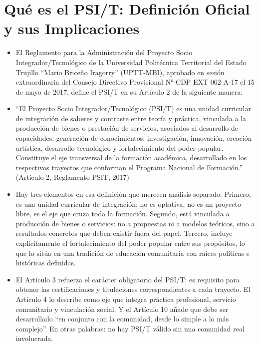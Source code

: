 \documentclass[14pt,a4paper,oneside]{extbook}
\begin{document}
\section{Qué es el PSI/T: Definición Oficial y sus Implicaciones}
\begin{itemize}
\item El Reglamento para la Administración del Proyecto Socio Integrador/Tecnológico de la Universidad Politécnica Territorial del Estado Trujillo \enquote{Mario Briceño Iragorry} (UPTT-MBI), aprobado en sesión extraordinaria del Consejo Directivo Provisional N° CDP EXT 062-A-17 el 15 de mayo de 2017, define el PSI/T en su Artículo 2 de la siguiente manera:
\item \enquote{El Proyecto Socio Integrador/Tecnológico (PSI/T) es una unidad curricular de integración de saberes y contraste entre teoría y práctica, vinculada a la producción de bienes o prestación de servicios, asociados al desarrollo de capacidades, generación de conocimientos, investigación, innovación, creación artística, desarrollo tecnológico y fortalecimiento del poder popular. Constituye el eje transversal de la formación académica, desarrollado en los respectivos trayectos que conforman el Programa Nacional de Formación.} (Artículo 2, Reglamento PSIT, 2017)
\item Hay tres elementos en esa definición que merecen análisis separado. Primero, es una unidad curricular de integración: no es optativa, no es un proyecto libre, es el eje que cruza toda la formación. Segundo, está vinculada a producción de bienes o servicios: no a propuestas ni a modelos teóricos, sino a resultados concretos que deben existir fuera del papel. Tercero, incluye explícitamente el fortalecimiento del poder popular entre sus propósitos, lo que lo sitúa en una tradición de educación comunitaria con raíces políticas e históricas definidas.
\item El Artículo 3 refuerza el carácter obligatorio del PSI/T: es requisito para obtener las certificaciones y titulaciones correspondientes a cada trayecto. El Artículo 4 lo describe como eje que integra práctica profesional, servicio comunitario y vinculación social. Y el Artículo 10 añade que debe ser desarrollado \enquote{en conjunto con la comunidad, desde lo simple a lo más complejo}. En otras palabras: no hay PSI/T válido sin una comunidad real involucrada.
\end{itemize}
\end{document}
